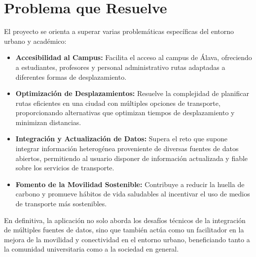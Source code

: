 \documentclass[a4paper,12pt]{report}
\begin{document}
      \section{Problema que Resuelve}
        El proyecto se orienta a superar varias problemáticas específicas del entorno urbano y académico:
        \begin{itemize}
          \item \textbf{Accesibilidad al Campus:} Facilita el acceso al campus de Álava, ofreciendo a estudiantes, profesores y personal administrativo rutas adaptadas a diferentes formas de desplazamiento.
          \item \textbf{Optimización de Desplazamientos:} Resuelve la complejidad de planificar rutas eficientes en una ciudad con múltiples opciones de transporte, proporcionando alternativas que optimizan tiempos de desplazamiento y minimizan distancias.
          \item \textbf{Integración y Actualización de Datos:} Supera el reto que supone integrar información heterogénea proveniente de diversas fuentes de datos abiertos, permitiendo al usuario disponer de información actualizada y fiable sobre los servicios de transporte.
          \item \textbf{Fomento de la Movilidad Sostenible:} Contribuye a reducir la huella de carbono y promueve hábitos de vida saludables al incentivar el uso de medios de transporte más sostenibles.
        \end{itemize}
        En definitiva, la aplicación no solo aborda los desafíos técnicos de la integración de múltiples fuentes de datos, sino que también actúa como un facilitador en la mejora de la movilidad y conectividad en el entorno urbano, beneficiando tanto a la comunidad universitaria como a la sociedad en general.
\end{document}
